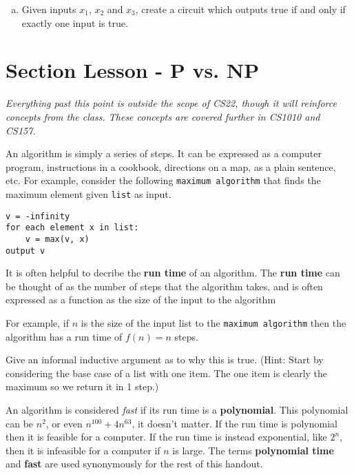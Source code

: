 \documentclass[12pt,letterpaper]{article}
\begin{document}
\begin{enumerate}[a.]
			\begin{mdframed}
			\vspace{6cm}
			\end{mdframed}

		\item Given inputs $x_1$, $x_2$ and $x_3$, create a circuit which outputs true if and only if exactly one input is true.

			\begin{mdframed}
			\vspace{10cm}
			\end{mdframed}
			
	\end{enumerate}

	\section*{Section Lesson - P vs. NP}

	\textit{Everything past this point is outside the scope of CS22, though it will reinforce concepts from the class. These concepts are covered further in CS1010 and CS157.}

	An algorithm is simply a series of steps. It can be expressed as a computer program, instructions in a cookbook, directions on a map, as a plain sentence, etc. For example, consider the following \texttt{maximum algorithm} that finds the maximum element given \texttt{list} as input.
\begin{verbatim}
v = -infinity
for each element x in list:
    v = max(v, x)
output v
\end{verbatim}
It is often helpful to decribe the \textbf{run time} of an algorithm. The \textbf{run time} can be thought of as the number of steps that the algorithm takes, and is often expressed as a function as the size of the input to the algorithm

For example, if $n$ is the size of the input list to the \texttt{maximum algorithm} then the algorithm has a run time of $f(n) = n$ steps. 

Give an informal inductive argument as to why this is true. (Hint: Start by considering the base case of a list with one item. The one item is clearly the maximum so we return it in 1 step.)

\begin{mdframed}
\vspace{8cm}
\end{mdframed}

An algorithm is considered \emph{fast} if its run time is a \textbf{polynomial}. This polynomial can be $n^2$, or even $n^{100} + 4n^{63}$, it doesn't matter. If the run time is polynomial then it is feasible for a computer. If the run time is instead exponential, like $2^n$, then it is infeasible for a computer if $n$ is large. The terms \textbf{polynomial time} and \textbf{fast} are used synonymously for the rest of this handout. 
\end{document}
